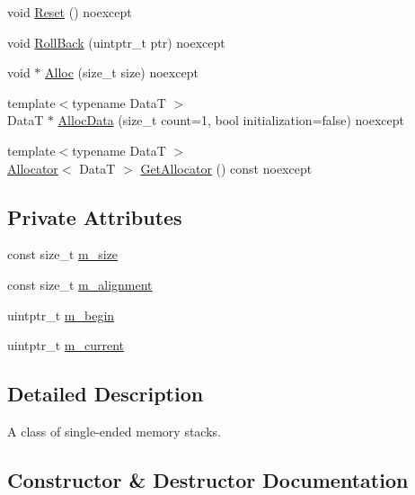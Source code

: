 \begin{DoxyCompactItemize}
\item 
void \hyperlink{classmage_1_1_single_ended_memory_stack_abd43ab7bd76655265123b934ea2bc7a7}{Reset} () noexcept
\item 
void \hyperlink{classmage_1_1_single_ended_memory_stack_afa1fcaa95a61995234759f9c57723202}{Roll\+Back} (uintptr\+\_\+t ptr) noexcept
\item 
void $\ast$ \hyperlink{classmage_1_1_single_ended_memory_stack_acda0b7f2e61bf8ba8bbb9ba633237866}{Alloc} (size\+\_\+t size) noexcept
\item 
{\footnotesize template$<$typename DataT $>$ }\\DataT $\ast$ \hyperlink{classmage_1_1_single_ended_memory_stack_ae957490450194631b81b9f6ba84f5f5a}{Alloc\+Data} (size\+\_\+t count=1, bool initialization=false) noexcept
\item 
{\footnotesize template$<$typename DataT $>$ }\\\hyperlink{structmage_1_1_single_ended_memory_stack_1_1_allocator}{Allocator}$<$ DataT $>$ \hyperlink{classmage_1_1_single_ended_memory_stack_a92f0c10ddfd1cdcba2fc9e8842382e41}{Get\+Allocator} () const noexcept
\end{DoxyCompactItemize}
\subsection*{Private Attributes}
\begin{DoxyCompactItemize}
\item 
const size\+\_\+t \hyperlink{classmage_1_1_single_ended_memory_stack_a3766c742087068479c3e324280ca94bf}{m\+\_\+size}
\item 
const size\+\_\+t \hyperlink{classmage_1_1_single_ended_memory_stack_aeb5bc5af575eaeb5a0f08669a717cd28}{m\+\_\+alignment}
\item 
uintptr\+\_\+t \hyperlink{classmage_1_1_single_ended_memory_stack_a859a80ab120c14e3ebf4a310d5263507}{m\+\_\+begin}
\item 
uintptr\+\_\+t \hyperlink{classmage_1_1_single_ended_memory_stack_a78785ecceac6ce271658864dac80e84b}{m\+\_\+current}
\end{DoxyCompactItemize}


\subsection{Detailed Description}
A class of single-\/ended memory stacks. 

\subsection{Constructor \& Destructor Documentation}
\hypertarget{classmage_1_1_single_ended_memory_stack_ab9555d63b35070aee321cc3839fec3c4}{}\label{classmage_1_1_single_ended_memory_stack_ab9555d63b35070aee321cc3839fec3c4} 
